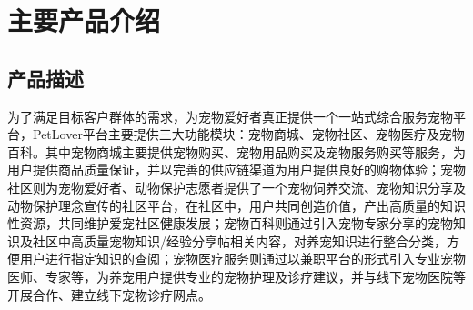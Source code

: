 \documentclass[a4paper]{ctexart}
\begin{document}
\section{主要产品介绍}

\subsection{产品描述}
为了满足目标客户群体的需求，为宠物爱好者真正提供一个一站式综合服务宠物平台，PetLover平台主要提供三大功能模块：宠物商城、宠物社区、宠物医疗及宠物百科。其中宠物商城主要提供宠物购买、宠物用品购买及宠物服务购买等服务，为用户提供商品质量保证，并以完善的供应链渠道为用户提供良好的购物体验；宠物社区则为宠物爱好者、动物保护志愿者提供了一个宠物饲养交流、宠物知识分享及动物保护理念宣传的社区平台，在社区中，用户共同创造价值，产出高质量的知识性资源，共同维护爱宠社区健康发展；宠物百科则通过引入宠物专家分享的宠物知识及社区中高质量宠物知识/经验分享帖相关内容，对养宠知识进行整合分类，方便用户进行指定知识的查阅；宠物医疗服务则通过以兼职平台的形式引入专业宠物医师、专家等，为养宠用户提供专业的宠物护理及诊疗建议，并与线下宠物医院等开展合作、建立线下宠物诊疗网点。
\end{document}
